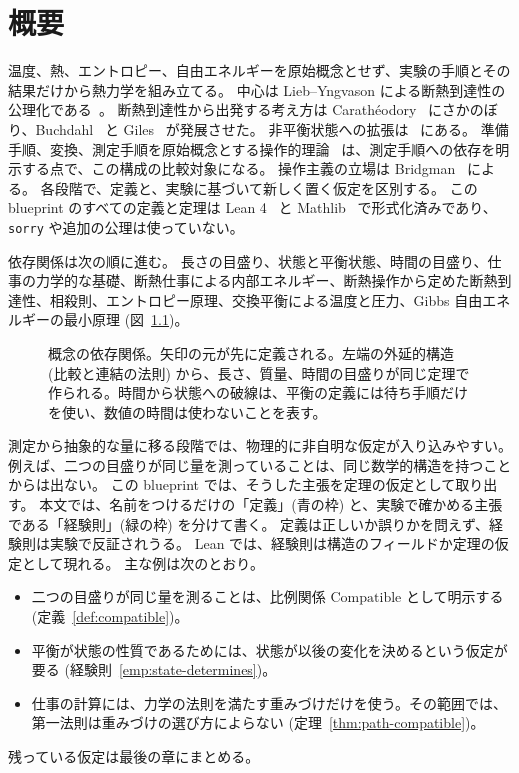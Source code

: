 
\chapter{概要}

温度、熱、エントロピー、自由エネルギーを原始概念とせず、実験の手順とその結果だけから熱力学を組み立てる。
中心は Lieb--Yngvason による断熱到達性の公理化である~\cite{LY99,LY98,LY00}。
断熱到達性から出発する考え方は Carathéodory~\cite{Caratheodory1909} にさかのぼり、Buchdahl~\cite{Buchdahl1966} と Giles~\cite{Giles1964} が発展させた。
非平衡状態への拡張は~\cite{LY13} にある。
準備手順、変換、測定手順を原始概念とする操作的理論~\cite{Hardy2001,CDP2010} は、測定手順への依存を明示する点で、この構成の比較対象になる。
操作主義の立場は Bridgman~\cite{Bridgman1927} による。
各段階で、定義と、実験に基づいて新しく置く仮定を区別する。
この blueprint のすべての定義と定理は Lean 4~\cite{Lean4} と Mathlib~\cite{Mathlib2020} で形式化済みであり、\texttt{sorry} や追加の公理は使っていない。

依存関係は次の順に進む。
長さの目盛り、状態と平衡状態、時間の目盛り、仕事の力学的な基礎、断熱仕事による内部エネルギー、断熱操作から定めた断熱到達性、相殺則、エントロピー原理、交換平衡による温度と圧力、Gibbs 自由エネルギーの最小原理 (図~\ref{fig:chain})。

\begin{figure}[htbp]
  \centering
  \caption{概念の依存関係。矢印の元が先に定義される。左端の外延的構造 (比較と連結の法則) から、長さ、質量、時間の目盛りが同じ定理で作られる。時間から状態への破線は、平衡の定義には待ち手順だけを使い、数値の時間は使わないことを表す。}
  \label{fig:chain}
\end{figure}

測定から抽象的な量に移る段階では、物理的に非自明な仮定が入り込みやすい。
例えば、二つの目盛りが同じ量を測っていることは、同じ数学的構造を持つことからは出ない。
この blueprint では、そうした主張を定理の仮定として取り出す。
本文では、名前をつけるだけの「定義」(青の枠) と、実験で確かめる主張である「経験則」(緑の枠) を分けて書く。
定義は正しいか誤りかを問えず、経験則は実験で反証されうる。
Lean では、経験則は構造のフィールドか定理の仮定として現れる。
主な例は次のとおり。
\begin{itemize}
  \item 二つの目盛りが同じ量を測ることは、比例関係 $\mathrm{Compatible}$ として明示する (定義~\ref{def:compatible})。
  \item 平衡が状態の性質であるためには、状態が以後の変化を決めるという仮定が要る (経験則~\ref{emp:state-determines})。
  \item 仕事の計算には、力学の法則を満たす重みづけだけを使う。その範囲では、第一法則は重みづけの選び方によらない (定理~\ref{thm:path-compatible})。
\end{itemize}
残っている仮定は最後の章にまとめる。

